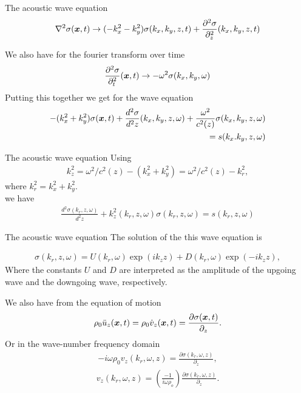 \documentclass[xcolor=dvipsnames,notes]{beamer}
\begin{document}
\begin{frame}{The acoustic wave equation}
\begin{eqnarray}
\nabla^2 \sigma(\mbox{\boldmath $x$},t) \rightarrow (-k^2_x -k^2_y)\sigma(k_x,k_y,z,t)+
                        \frac{\partial^2 \sigma}{\partial^2_z}(k_x,k_y,z,t) 
\end{eqnarray}

We also have for the fourier transform over time
\begin{eqnarray} 
\frac{\partial^2\sigma}{\partial^2_t}(\mbox{\boldmath $x$},t) \rightarrow -\omega^2\sigma(k_x,k_y,\omega)
\end{eqnarray}
Putting this together we get for the wave equation
\begin{eqnarray}
-(k^2_x+k^2_y)\sigma(\mbox{\boldmath $x$},t)+ \frac{d^2\sigma}{d^2z}(k_x,k_y,z,\omega)+\frac{\omega^2}{c^2(z)} \sigma(k_x,k_y,z,\omega) \\ = s(k_x.k_y,z,\omega)
                                                     \label{eq:wave4}
\end{eqnarray}
\end{frame}
\begin{frame}{The acoustic wave equation}
Using 
\begin{eqnarray}
   k^2_z = \omega^2/c^2(z)-(k^2_x+k^2_y) = \omega^2/c^2(z)-k^2_r, 
\end{eqnarray}
where $k^2_r = k^2_x+k^2_y$.\\
we have
\begin{eqnarray}
\frac{d^2\sigma(k_r,z,\omega)}{d^2z}+ k_z^2(k_r,z,\omega)\sigma(k_r,z,\omega) = s(k_r,z,\omega)
                                                     \label{eq:wave5}
\end{eqnarray}
\end{frame}
\begin{frame}{The acoustic wave equation}
The solution of the this wave equation is

\begin{eqnarray}
   \sigma(k_r,z,\omega) = U(k_r,\omega)\exp(ik_z z) + D(k_r,\omega)\exp(-ik_z z),
                               \label{eq:sigma}
\end{eqnarray}
Where the constants $U$ and $D$ are interpreted as the amplitude of the upgoing wave and
the downgoing wave, respectively.

We also have from the equation of motion
\begin{eqnarray}
 \rho_0\ddot{u}_z(\mbox{\boldmath $x$},t) = \rho_0\dot{v}_z(\mbox{\boldmath $x$},t) = \frac{\partial \sigma(\mbox{\boldmath $x$},t)}{\partial_z}.
\end{eqnarray}
Or in the wave-number frequency domain
\begin{eqnarray}
  -i\omega\rho_0 v_z(k_r,\omega,z) = \frac{\partial \sigma(k_r,\omega,z)}{\partial_z},
\end{eqnarray}
\begin{eqnarray}
  v_z(k_r,\omega,z) = \left(\frac{-1}{i\omega\rho_o}\right)\frac{\partial \sigma(k_r,\omega,z)}{\partial_z}.
\end{eqnarray}
\end{frame}
\end{document}
